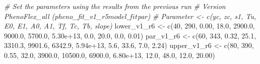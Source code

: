 \documentclass[
]{article}
\newenvironment{Shaded}{\begin{snugshade}}{\end{snugshade}}
\newcommand{\CommentTok}[1]{\textcolor[rgb]{0.56,0.35,0.01}{\textit{#1}}}
\newcommand{\DecValTok}[1]{\textcolor[rgb]{0.00,0.00,0.81}{#1}}
\newcommand{\FloatTok}[1]{\textcolor[rgb]{0.00,0.00,0.81}{#1}}
\newcommand{\FunctionTok}[1]{\textcolor[rgb]{0.00,0.00,0.00}{#1}}
\newcommand{\NormalTok}[1]{#1}
\newcommand{\OtherTok}[1]{\textcolor[rgb]{0.56,0.35,0.01}{#1}}
\begin{document}
\begin{Shaded}
\begin{Highlighting}[]
\CommentTok{\# Set the parameters using the results from the previous run}
\CommentTok{\# Version PhenoFlex\_all (pheno\_fit\_v1\_r5$model\_fit$par)}
\CommentTok{\# Parameter \textless{}{-} c(yc,  zc,   s1,   Tu,     E0,      E1,     A0,       A1,   Tf,   Tc,   Tb, slope)}
\NormalTok{lower\_v1\_r6 }\OtherTok{\textless{}{-}} \FunctionTok{c}\NormalTok{(}\DecValTok{40}\NormalTok{, }\DecValTok{290}\NormalTok{, }\FloatTok{0.00}\NormalTok{, }\FloatTok{18.0}\NormalTok{, }\FloatTok{2900.0}\NormalTok{,  }\FloatTok{9000.0}\NormalTok{, }\FloatTok{5700.0}\NormalTok{, }\FloatTok{5.30e+13}\NormalTok{,  }\FloatTok{0.0}\NormalTok{, }\FloatTok{20.0}\NormalTok{,  }\FloatTok{0.0}\NormalTok{,  }\FloatTok{0.01}\NormalTok{)}
\NormalTok{par\_v1\_r6   }\OtherTok{\textless{}{-}} \FunctionTok{c}\NormalTok{(}\DecValTok{60}\NormalTok{, }\DecValTok{343}\NormalTok{, }\FloatTok{0.32}\NormalTok{, }\FloatTok{25.1}\NormalTok{, }\FloatTok{3310.3}\NormalTok{,  }\FloatTok{9901.6}\NormalTok{, }\FloatTok{6342.9}\NormalTok{, }\FloatTok{5.94e+13}\NormalTok{,  }\FloatTok{5.6}\NormalTok{, }\FloatTok{33.6}\NormalTok{,  }\FloatTok{7.0}\NormalTok{,  }\FloatTok{2.24}\NormalTok{)}
\NormalTok{upper\_v1\_r6 }\OtherTok{\textless{}{-}} \FunctionTok{c}\NormalTok{(}\DecValTok{80}\NormalTok{, }\DecValTok{390}\NormalTok{, }\FloatTok{0.55}\NormalTok{, }\FloatTok{32.0}\NormalTok{, }\FloatTok{3900.0}\NormalTok{, }\FloatTok{10500.0}\NormalTok{, }\FloatTok{6900.0}\NormalTok{, }\FloatTok{6.80e+13}\NormalTok{, }\FloatTok{12.0}\NormalTok{, }\FloatTok{48.0}\NormalTok{, }\FloatTok{12.0}\NormalTok{, }\FloatTok{20.00}\NormalTok{)}



\end{Highlighting}
\end{Shaded}
\end{document}
